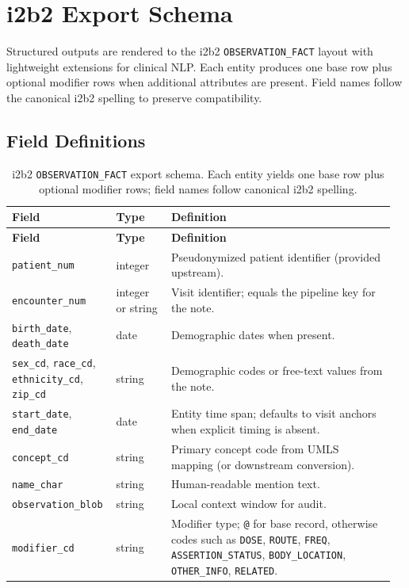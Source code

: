 \section{i2b2 Export Schema}

Structured outputs are rendered to the i2b2 \texttt{OBSERVATION\_FACT} layout with lightweight extensions for clinical NLP. Each entity produces one base row plus optional modifier rows when additional attributes are present. Field names follow the canonical i2b2 spelling to preserve compatibility.

\subsection{Field Definitions}
\begin{longtable}{@{}p{0.24\linewidth}p{0.14\linewidth}p{0.58\linewidth}@{}}
\caption{i2b2 \texttt{OBSERVATION\_FACT} export schema. Each entity yields one base row plus optional modifier rows; field names follow canonical i2b2 spelling.}\label{supp:i2b2-schema}\\
\toprule
\textbf{Field} & \textbf{Type} & \textbf{Definition} \\
\midrule
\endfirsthead
\toprule
\textbf{Field} & \textbf{Type} & \textbf{Definition} \\
\midrule
\endhead
\texttt{patient\_num} & integer & Pseudonymized patient identifier (provided upstream). \\
\texttt{encounter\_num} & integer or string & Visit identifier; equals the pipeline key for the note. \\
\texttt{birth\_date}, \texttt{death\_date} & date & Demographic dates when present. \\
\texttt{sex\_cd}, \texttt{race\_cd}, \texttt{ethnicity\_cd}, \texttt{zip\_cd} & string & Demographic codes or free-text values from the note. \\
\texttt{start\_date}, \texttt{end\_date} & date & Entity time span; defaults to visit anchors when explicit timing is absent. \\
\texttt{concept\_cd} & string & Primary concept code from UMLS mapping (or downstream conversion). \\
\texttt{name\_char} & string & Human-readable mention text. \\
\texttt{observation\_blob} & string & Local context window for audit. \\
\texttt{modifier\_cd} & string & Modifier type; \texttt{@} for base record, otherwise codes such as \texttt{DOSE}, \texttt{ROUTE}, \texttt{FREQ}, \texttt{ASSERTION\_STATUS}, \texttt{BODY\_LOCATION}, \texttt{OTHER\_INFO}, \texttt{RELATED}. \\

\end{longtable}
